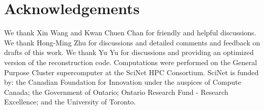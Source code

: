 \section*{Acknowledgements}
  \label{sec:acknowledgements}
  We thank Xin Wang and Kwan Chuen Chan for friendly and helpful discussions.  We thank 
  Hong-Ming Zhu for discussions and detailed comments and feedback on drafts of this work.
  We thank Yu Yu for discussions and providing an optimized version of the reconstruction code. 
  Computations were performed on
  the General Purpose Cluster supercomputer at the SciNet HPC
  Consortium.  SciNet is funded by: the Canadian Foundation for
  Innovation under the auspices of Compute Canada; the Government of
  Ontario; Ontario Research Fund - Research Excellence; and the
  University of Toronto.  

